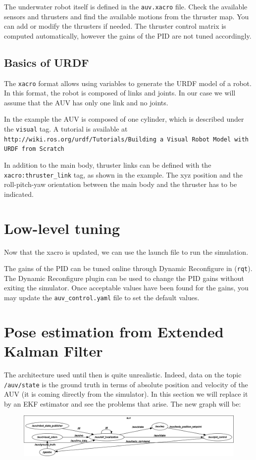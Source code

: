 \documentclass{ecnreport}
\begin{document}
The underwater robot itself is defined in the \texttt{auv.xacro} file. Check the available sensors and thrusters and find the available motions from the thruster map.
You can add or modify the thrusters if needed. The thruster control matrix is computed automatically, however the gains of the PID are not tuned accordingly.

\subsection{Basics of URDF}

The \texttt{xacro} format allows using variables to generate the URDF model of a robot. 
In this format, the robot is composed of links and joints. In our case we will assume that the AUV has only one link and no joints.

In the example the AUV is composed of one cylinder, which is described under the \texttt{visual} tag.
A tutorial is available at \texttt{http://wiki.ros.org/urdf/Tutorials/Building a Visual Robot Model with URDF from Scratch}

In addition to the main body, thruster links can be defined with the \texttt{xacro:thruster\_link} tag, as  shown in the example.
The xyz position and the roll-pitch-yaw orientation between the main body and the thruster has to be indicated.

\section{Low-level tuning}

Now that the xacro is updated, we can use the launch file to run the simulation.

The gains of the PID can be tuned online through Dynamic Reconfigure in (\texttt{rqt}).
The Dynamic Reconfigure plugin can be used to change the PID gains without exiting the simulator.
Once acceptable values have been found for the gains, you may update the \texttt{auv\_control.yaml} file to set the default values.

\section{Pose estimation from Extended Kalman Filter}

The architecture used until then is quite unrealistic.
Indeed, data on the topic \texttt{/auv/state} is the ground truth in terms of absolute position and velocity of the AUV (it is coming
directly from the simulator).
In this section we will replace it by an EKF estimator and see the problems that arise. The new graph will be:
\begin{figure}[h]\centering
 \includegraphics[width=\linewidth]{graph_ekf}
\end{figure}
\end{document}
